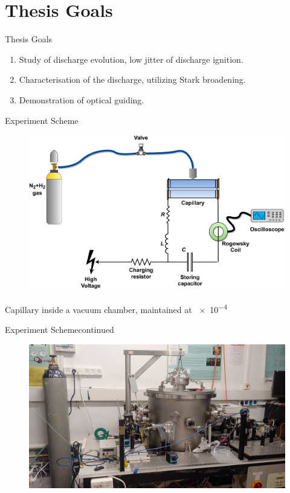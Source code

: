 \documentclass[dvipsnames]{beamer}
\begin{document}
\section{Thesis Goals}
\begin{frame}{Thesis Goals}
 \begin{enumerate}
\item Study of discharge evolution, low jitter of discharge ignition.
\item Characterisation of the discharge, utilizing Stark broadening.
\item Demonstration of optical guiding.
 \end{enumerate}
\end{frame}
\begin{frame}{Experiment Scheme}
\begin{figure}
 \includegraphics[width=\textwidth]{figures/results/jitter/discharge_scheme.pdf}
\end{figure}
Capillary inside a vacuum chamber, maintained at \SI{e-4}{\torr}
\end{frame}
\begin{frame}{Experiment Scheme}{continued}
\begin{figure}
 \includegraphics[width=\textwidth]{figures/results/jitter/system_picture.jpg}
\end{figure}
\end{frame}
\end{document}
